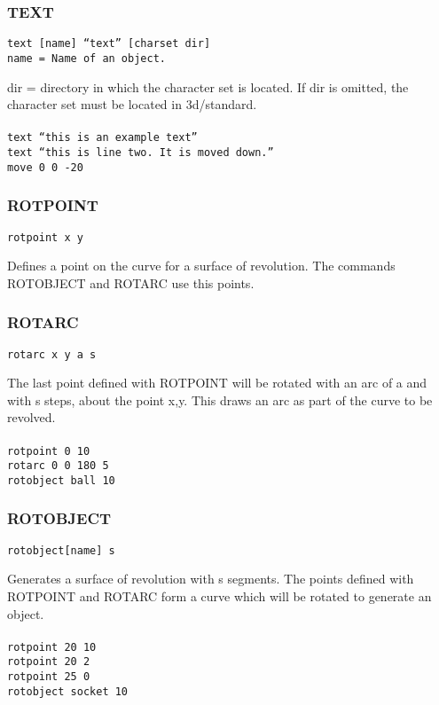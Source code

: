 \subsubsection{TEXT}
\tt{text [name] ``text'' [charset dir]}\\
name = Name of an object.

dir = directory in which the character set is located. If dir is omitted, the
character set must be located in 3d/standard.\\
\tt{
\\
text ``this is an example text''\\
text ``this is line two. It is moved down.''\\
move 0 0 -20
}

\subsubsection{ROTPOINT}
\tt{rotpoint x y}

Defines a point on the curve for a surface of revolution. The commands
ROTOBJECT and ROTARC use this points.

\subsubsection{ROTARC}
\tt{rotarc x y a s}

The last point defined with ROTPOINT will be rotated with an arc of a and
with s steps, about the point x,y. This draws an arc as part of the curve
to be revolved.\\
\tt{
\\
rotpoint 0 10\\
rotarc 0 0 180 5\\
rotobject ball 10\\
}

\subsubsection{ROTOBJECT}
\tt{rotobject[name] s}

Generates a surface of revolution with s segments. The points defined with
ROTPOINT and ROTARC form a curve which will be rotated to generate an
object.\\
\tt{
\\
rotpoint 20 10\\
rotpoint 20 2\\
rotpoint 25 0\\
rotobject socket 10\\
}

